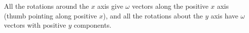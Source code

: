 All the rotations around the $x$ axis give $\omega$ vectors 
along the positive $x$ axis (thumb pointing along positive $x$), and all the rotations about 
the $y$ axis have $\omega$ vectors with positive $y$ components.



